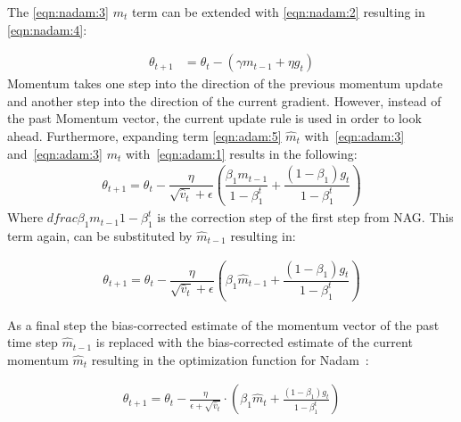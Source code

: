 The \ref{eqn:nadam:3} $m_t$ term can be extended with \ref{eqn:nadam:2} resulting in \ref{eqn:nadam:4}:

\begin{align}
\theta_{t+1} &= \theta_t - (\gamma m_{t-1} + \eta g_t) \label{eqn:nadam:5}
\end{align}
Momentum takes one step into the direction of the previous momentum update and another step into the direction of the current
gradient.
However, instead of the past Momentum vector, the current update rule is used in order to look ahead.
Furthermore, expanding term \ref{eqn:adam:5} $\hat{m}_t$ with~\ref{eqn:adam:3} and~\ref{eqn:adam:3} $m_t$ with~\ref{eqn:adam:1}
results in the following:
\begin{align}
 \theta_{t+1} = \theta_{t} - \dfrac{\eta}{\sqrt{\hat{v}_t} + \epsilon} (\dfrac{\beta_1 m_{t-1}}{1 - \beta^t_1} + \dfrac{(1 - \beta_1) g_t}{1 - \beta^t_1})
 \label{eqn:nadam:6}
\end{align}
Where $dfrac{\beta_1 m_{t-1}}{1 - \beta^t_1}$ is the correction step of the first step from NAG.
This term again, can be substituted by $\hat{m}_{t-1}$ resulting in:

\begin{align}
    \theta_{t+1} = \theta_{t} - \dfrac{\eta}{\sqrt{\hat{v}_t} + \epsilon} (\beta_1 \hat{m}_{t-1} + \dfrac{(1 - \beta_1) g_t}{1 - \beta^t_1})
    \label{eqn:nadam:7}
\end{align}

As a final step the bias-corrected estimate of the momentum vector of the past time step $\hat{m}_{t-1}$ is replaced
with the bias-corrected estimate of the current momentum $\hat{m}_{t}$ resulting in the optimization function for Nadam~\cite{optimizersoverview}:



\begin{align}
    \theta_{t+1} = \theta_{t} - \frac{\eta}{\epsilon+\sqrt{\hat{v}_t}} \cdot (\beta_1\hat{m}_t+\frac{(1-\beta_1)g_t}{1-\beta_1^t}) \label{eqn:nadam:8}
\end{align}
\\ \par




